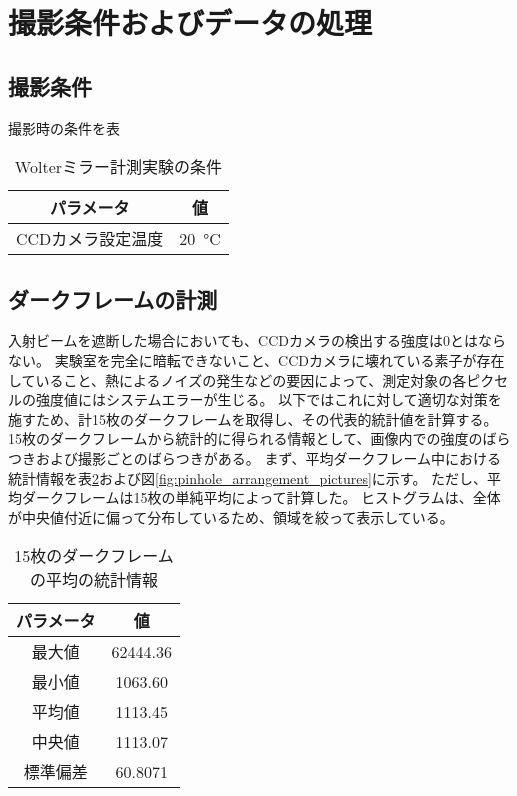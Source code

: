 \section{撮影条件およびデータの処理}

\subsection{撮影条件}
撮影時の条件を表

\begin{table}[!ht]
\begin{center}
  \caption{Wolterミラー計測実験の条件}
  \begin{tabular}{|c|c|} \hline
    パラメータ & 値 \\ \hline
    CCDカメラ設定温度 & \SI{20}{\degreeCelsius}  \\ \hline
  \end{tabular}
  \label{tb:mirror_experiment_params}
\end{center}
\end{table}

\subsection{ダークフレームの計測}
\label{chap5_darkflame_measurement}

入射ビームを遮断した場合においても、CCDカメラの検出する強度は0とはならない。
実験室を完全に暗転できないこと、CCDカメラに壊れている素子が存在していること、熱によるノイズの発生などの要因によって、測定対象の各ピクセルの強度値にはシステムエラーが生じる。
以下ではこれに対して適切な対策を施すため、計15枚のダークフレームを取得し、その代表的統計値を計算する。
15枚のダークフレームから統計的に得られる情報として、画像内での強度のばらつきおよび撮影ごとのばらつきがある。
まず、平均ダークフレーム中における統計情報を表\ref{tb:darkflame_average_data}および図\ref{fig:pinhole_arrangement_pictures}に示す。
ただし、平均ダークフレームは15枚の単純平均によって計算した。
ヒストグラムは、全体が中央値付近に偏って分布しているため、領域を絞って表示している。

\begin{table}[!ht]
\begin{center}
  \caption{15枚のダークフレームの平均の統計情報}
  \begin{tabular}{|c|c|} \hline
    パラメータ & 値 \\ \hline
    最大値 & 62444.36 \\
    最小値 & 1063.60 \\
    平均値 & 1113.45 \\
    中央値 & 1113.07 \\
    標準偏差 & 60.8071 \\ \hline
  \end{tabular}
  \label{tb:darkflame_average_data}
\end{center}
\end{table}


